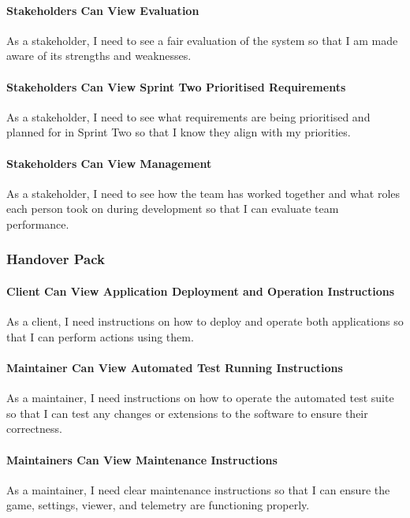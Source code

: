 \paragraph{Stakeholders Can View Evaluation}
As a stakeholder, I need to see a fair evaluation of the system so that I am made aware of its strengths and weaknesses.

\paragraph{Stakeholders Can View Sprint Two Prioritised Requirements}
As a stakeholder, I need to see what requirements are being prioritised and planned for in Sprint Two so that I know they align with my priorities.

\paragraph{Stakeholders Can View Management}
As a stakeholder, I need to see how the team has worked together and what roles each person took on during development so that I can evaluate team performance.

\subsubsection{Handover Pack}

\paragraph{Client Can View Application Deployment and Operation Instructions}
As a client, I need instructions on how to deploy and operate both applications so that I can perform actions using them.

\paragraph{Maintainer Can View Automated Test Running Instructions}
As a maintainer, I need instructions on how to operate the automated test suite so that I can test any changes or extensions to the software to ensure their correctness.

\paragraph{Maintainers Can View Maintenance Instructions}
As a maintainer, I need clear maintenance instructions so that I can ensure the game, settings, viewer, and telemetry are functioning properly.

